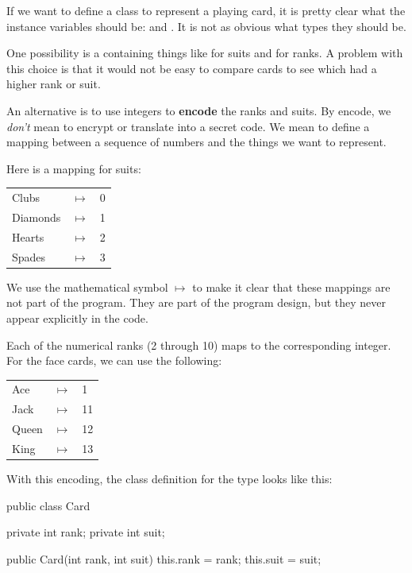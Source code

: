 
If we want to define a class to represent a playing card, it is pretty clear what the instance variables should be:  and .
It is not as obvious what types they should be.

One possibility is a  containing things like  for suits and  for ranks.
A problem with this choice is that it would not be easy to compare cards to see which had a higher rank or suit.


An alternative is to use integers to {\bf encode} the ranks and suits.
By encode, we {\em don't} mean to encrypt or translate into a secret code.
We mean to define a mapping between a sequence of numbers and the things we want to represent.

Here is a mapping for suits:

\begin{tabular}{l c l}
Clubs & $\mapsto$ & 0 \\
Diamonds & $\mapsto$ & 1 \\
Hearts & $\mapsto$ & 2 \\
Spades & $\mapsto$ & 3
\end{tabular}


We use the mathematical symbol $\mapsto$ to make it clear that these mappings are not part of the program.
They are part of the program design, but they never appear explicitly in the code.

Each of the numerical ranks (2 through 10) maps to the corresponding integer.
For the face cards, we can use the following:

\begin{tabular}{l c l}
Ace & $\mapsto$ & 1 \\
Jack & $\mapsto$ & 11 \\
Queen & $\mapsto$ & 12 \\
King & $\mapsto$ & 13 \\
\end{tabular}

With this encoding, the class definition for the  type looks like this:

\begin{code}
public class Card {
    private int rank;
    private int suit;

    public Card(int rank, int suit) {
        this.rank = rank;
        this.suit = suit;
    }
}
\end{code}

